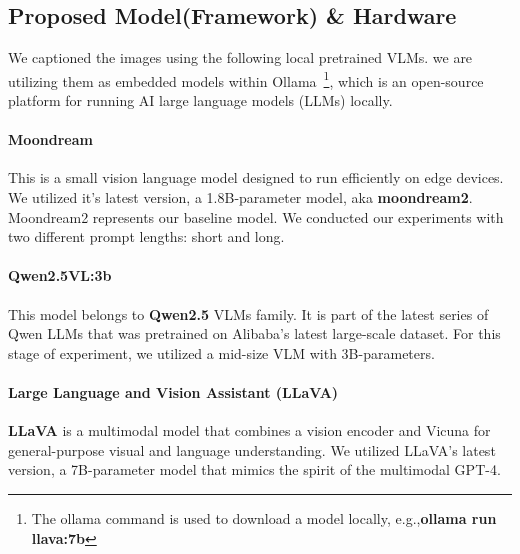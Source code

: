 \documentclass[runningheads]{llncs}
\begin{document}
\subsection{Proposed Model(Framework) \& Hardware}
We captioned the images using the following local pretrained VLMs. we are utilizing them as embedded models within Ollama~\footnote{The ollama command is used to download a model locally, e.g.,\textbf{ollama run llava:7b}}, which is an open-source platform for running AI large language models (LLMs) locally.

\paragraph{Moondream} This is a small vision language model designed to run efficiently on edge devices. We utilized it's latest version, a 1.8B-parameter model, aka \textbf{moondream2}. Moondream2 represents our baseline model.  We conducted our experiments with two different prompt lengths: short and long.

\paragraph{Qwen2.5VL:3b} This model belongs to \textbf{Qwen2.5} VLMs family. It is part of the latest series of Qwen LLMs that was pretrained on Alibaba's latest large-scale dataset. For this stage of experiment, we utilized a mid-size VLM with 3B-parameters.


\paragraph{Large Language and Vision Assistant (LLaVA)} \textbf{LLaVA} is a multimodal model that combines a vision encoder and Vicuna for general-purpose visual and language understanding. %
We utilized LLaVA's latest version, a 7B-parameter model that mimics the spirit of the multimodal GPT-4.


\end{document}
